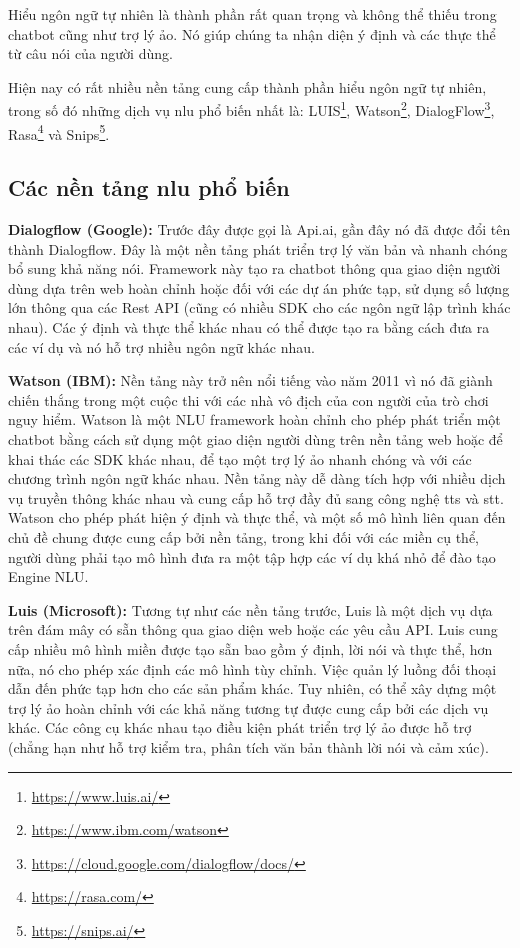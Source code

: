 Hiểu ngôn ngữ tự nhiên là thành phần rất quan trọng và không thể thiếu trong chatbot cũng như trợ lý ảo. Nó giúp chúng ta nhận diện ý định và các thực thể từ câu nói của người dùng.

Hiện nay có rất nhiều nền tảng cung cấp thành phần hiểu ngôn ngữ tự nhiên, trong số đó những dịch vụ \ac{nlu} phổ biến nhất là: LUIS\footnote{\url{https://www.luis.ai/}}, Watson\footnote{\url{https://www.ibm.com/watson}}, DialogFlow\footnote{\url{https://cloud.google.com/dialogflow/docs/}}, Rasa\footnote{\url{https://rasa.com/}} và Snips\footnote{\url{https://snips.ai/}}.

\subsection{Các nền tảng \ac{nlu} phổ biến}

\textbf{Dialogflow (Google):} Trước đây được gọi là Api.ai, gần đây nó đã được đổi tên thành Dialogflow. Đây là một nền tảng phát triển trợ lý văn bản và nhanh chóng bổ sung khả năng nói. Framework này tạo ra chatbot thông qua giao diện người dùng dựa trên web hoàn chỉnh hoặc đối với các dự án phức tạp, sử dụng số lượng lớn thông qua các Rest API (cũng có nhiều SDK cho các ngôn ngữ lập trình khác nhau). Các ý định và thực thể khác nhau có thể được tạo ra bằng cách đưa ra các ví dụ và nó hỗ trợ nhiều ngôn ngữ khác nhau.

\textbf{Watson (IBM):} Nền tảng này trở nên nổi tiếng vào năm 2011 vì nó đã giành chiến thắng trong một cuộc thi với các nhà vô địch của con người của trò chơi nguy hiểm. Watson là một NLU framework hoàn chỉnh cho phép phát triển một chatbot bằng cách sử dụng một giao diện người dùng trên nền tảng web hoặc để khai thác các SDK khác nhau, để tạo một trợ lý ảo nhanh chóng và với các chương trình ngôn ngữ khác nhau. Nền tảng này dễ dàng tích hợp với nhiều dịch vụ truyền thông khác nhau và cung cấp hỗ trợ đầy đủ sang công nghệ \ac{tts} và \ac{stt}. Watson cho phép phát hiện ý định và thực thể, và một số mô hình liên quan đến chủ đề chung được cung cấp bởi nền tảng, trong khi đối với các miền cụ thể, người dùng phải tạo mô hình đưa ra một tập hợp các ví dụ khá nhỏ để đào tạo Engine NLU.

\textbf{Luis (Microsoft):} Tương tự như các nền tảng trước, Luis là một dịch vụ dựa trên đám mây có sẵn thông qua giao diện web hoặc các yêu cầu API. Luis cung cấp nhiều mô hình miền được tạo sẵn bao gồm ý định, lời nói và thực thể, hơn nữa, nó cho phép xác định các mô hình tùy chỉnh. Việc quản lý luồng đối thoại dẫn đến phức tạp hơn cho các sản phẩm khác. Tuy nhiên, có thể xây dựng một trợ lý ảo hoàn chỉnh với các khả năng tương tự được cung cấp bởi các dịch vụ khác. Các công cụ khác nhau tạo điều kiện phát triển trợ lý ảo được hỗ trợ (chẳng hạn như hỗ trợ kiểm tra, phân tích văn bản thành lời nói và cảm xúc).

